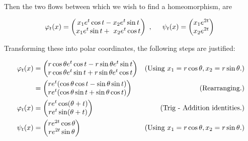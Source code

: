 \begin{solution}
    Then the two flows between which we wish to find a homeomorphism, are 

    \alignbreak
    \[
    \varphi_t(x)  =  
        \begin{pmatrix}
            x_1e^t\cos t -  x_2e^t\sin t\\
            x_1e^t\sin t +\ x_2e^t\cos t
        \end{pmatrix}\
        ,
        \hspace{5mm}
    \psi_t(x)   =   
        \begin{pmatrix}
            x_1e^{2t}\\
            x_2e^{2t}
        \end{pmatrix}\
    \]
    \alignbreak

\newpage
    Transforming these into polar coordinates, the following steps are justified:

    \alignbreak
    \begin{align}
        \varphi_t(x) &= 
        \begin{pmatrix}
            r\cos \theta e^t \cos t - r \sin \theta e^t \sin t\\
            r\cos \theta e^t \sin t + r \sin \theta e^t \cos t
        \end{pmatrix} &\text{(Using $x_1 = r\cos \theta, x_2 = r\sin \theta$.)}\nonumber\\
        &= \begin{pmatrix}
            re^t(\cos \theta  \cos t - \sin \theta \sin t)\\
            re^t(\cos \theta  \sin t + \sin \theta \cos t)
        \end{pmatrix} &\text{(Rearranging.)}\nonumber\\
        \varphi_t(x) &= \begin{pmatrix}
            re^t\cos(\theta + t)\\
            re^t\sin (\theta  + t) 
        \end{pmatrix} &\text{(Trig - Addition identities.)}\nonumber\\
        \psi_t(x) &=   
        \begin{pmatrix}
            re^{2t}\cos \theta \\
            re^{2t}\sin \theta 
        \end{pmatrix}&\text{(Using $x_1 = r\cos \theta, x_2 = r\sin \theta.$)}\nonumber
    \end{align}


\end{solution}

